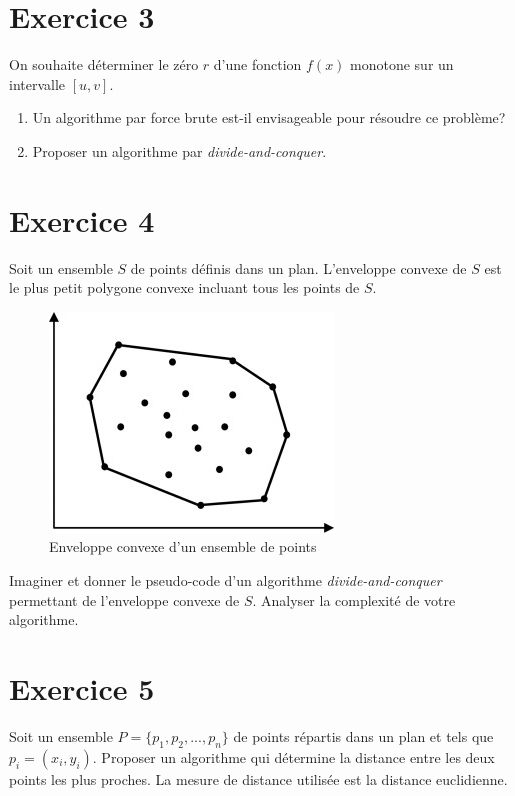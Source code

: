 \documentclass[a4paper,10pt]{article}
\begin{document}
\section*{Exercice 3}

On souhaite déterminer le zéro $r$ d'une fonction $f(x)$ monotone sur un intervalle $[u, v]$.

\begin{enumerate}
\item Un algorithme par force brute est-il envisageable pour résoudre ce problème?
\item Proposer un algorithme par \textit{divide-and-conquer}.
\end{enumerate}


\section*{Exercice 4}

Soit un ensemble $S$ de points définis dans un plan. L'enveloppe convexe de $S$
est le plus petit polygone convexe incluant tous les points de $S$.

\begin{figure}[h]
    \center
    \includegraphics[scale=1.0]{convexhull.jpg}
    \caption{Enveloppe convexe d'un ensemble de points}
\end{figure}

Imaginer et donner le pseudo-code d'un algorithme \textit{divide-and-conquer}
permettant de l'enveloppe convexe de $S$. Analyser la complexité de votre
algorithme.


\section*{Exercice 5}

Soit un ensemble $P = \{p_1, p_2, ..., p_n\}$ de points répartis dans un plan et tels que $p_i = (x_i, y_i)$. Proposer un algorithme qui détermine la distance entre les deux points les plus proches. La mesure de distance utilisée est la distance euclidienne.
\end{document}
